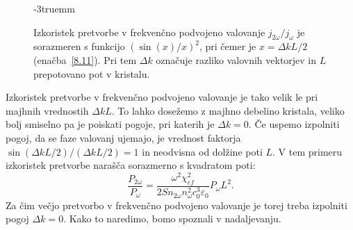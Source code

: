 \begin{figure}[ht]
\centering
\def\svgwidth{72truemm} 

\caption{Izkoristek pretvorbe v frekvenčno podvojeno valovanje $j_{2\omega}/j_\omega$ je 
sorazmeren s funkcijo $(\sin(x)/x)^2$,
pri čemer je $x = \Delta k L/2$ (enačba~\ref{8.11}). 
Pri tem $\Delta k$ označuje razliko valovnih vektorjev in
$L$ prepotovano pot v kristalu.}
\label{fig:shg2}
\vglue-3truemm
\end{figure}
Izkoristek pretvorbe v frekvenčno podvojeno valovanje je tako velik le pri  majhnih vred\-no\-stih 
$\Delta kL$. To lahko dosežemo z majhno debelino kristala, veliko bolj smiselno
pa je poiskati pogoje, pri katerih je $\Delta k = 0$. Če uspemo izpolniti pogoj, da
se faze valovanj ujemajo, je vrednost faktorja 
$\sin(\Delta kL/2)/(\Delta kL/2)=1$ in neodvisna od dolžine poti $L$.
V tem primeru izkoristek pretvorbe narašča sorazmerno s kvadratom poti:
\begin{equation}
\frac{P_{2\omega}}{P_{\omega}}=
\frac{\omega^2 \chi_{ef}^2}{2 S n_{2\omega} n_\omega^2c_0^3\varepsilon_0} P_\omega L^2.
\label{eq:shgl2}
\end{equation}
Za čim večjo pretvorbo v frekvenčno podvojeno valovanje je torej treba 
izpolniti pogoj $\Delta k = 0$. Kako to naredimo,
bomo spoznali v nadaljevanju.

